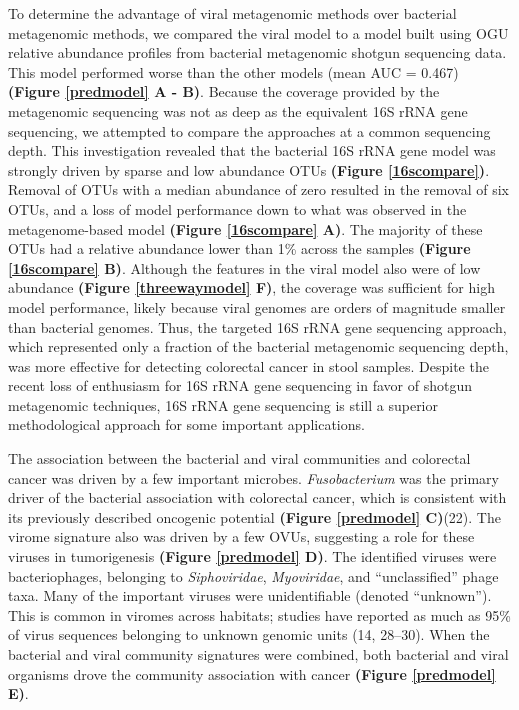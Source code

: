 \documentclass[12pt,]{article}
\begin{document}
To determine the advantage of viral metagenomic methods over bacterial
metagenomic methods, we compared the viral model to a model built using
OGU relative abundance profiles from bacterial metagenomic shotgun
sequencing data. This model performed worse than the other models (mean
AUC = 0.467) \textbf{(Figure \ref{predmodel} A - B)}. Because the
coverage provided by the metagenomic sequencing was not as deep as the
equivalent 16S rRNA gene sequencing, we attempted to compare the
approaches at a common sequencing depth. This investigation revealed
that the bacterial 16S rRNA gene model was strongly driven by sparse and
low abundance OTUs \textbf{(Figure \ref{16scompare})}. Removal of OTUs
with a median abundance of zero resulted in the removal of six OTUs, and
a loss of model performance down to what was observed in the
metagenome-based model \textbf{(Figure \ref{16scompare} A)}. The
majority of these OTUs had a relative abundance lower than 1\% across
the samples \textbf{(Figure \ref{16scompare} B)}. Although the features
in the viral model also were of low abundance \textbf{(Figure
\ref{threewaymodel} F)}, the coverage was sufficient for high model
performance, likely because viral genomes are orders of magnitude
smaller than bacterial genomes. Thus, the targeted 16S rRNA gene
sequencing approach, which represented only a fraction of the bacterial
metagenomic sequencing depth, was more effective for detecting
colorectal cancer in stool samples. Despite the recent loss of
enthusiasm for 16S rRNA gene sequencing in favor of shotgun metagenomic
techniques, 16S rRNA gene sequencing is still a superior methodological
approach for some important applications.

The association between the bacterial and viral communities and
colorectal cancer was driven by a few important microbes.
\emph{Fusobacterium} was the primary driver of the bacterial association
with colorectal cancer, which is consistent with its previously
described oncogenic potential \textbf{(Figure \ref{predmodel} C)}(22).
The virome signature also was driven by a few OVUs, suggesting a role
for these viruses in tumorigenesis \textbf{(Figure \ref{predmodel} D)}.
The identified viruses were bacteriophages, belonging to
\emph{Siphoviridae}, \emph{Myoviridae}, and ``unclassified'' phage taxa.
Many of the important viruses were unidentifiable (denoted ``unknown'').
This is common in viromes across habitats; studies have reported as much
as 95\% of virus sequences belonging to unknown genomic units (14,
28--30). When the bacterial and viral community signatures were
combined, both bacterial and viral organisms drove the community
association with cancer \textbf{(Figure \ref{predmodel} E)}.
\end{document}
